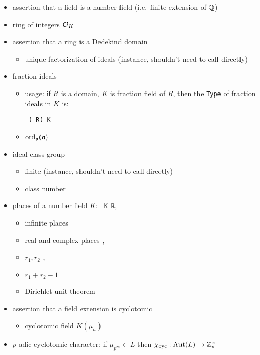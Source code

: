 \begin{itemize}
\item
assertion that a field is a number field (i.e.~finite extension of ${\mathbb {Q}}$)
\item
ring of integers ${\mathcal {O}}_K$ 
\item
assertion that a ring is a Dedekind domain 
\begin{itemize}
\item
unique factorization of ideals 
(instance, shouldn't need to call directly)
\end{itemize}
\item
fraction ideals 
\begin{itemize}
\item
usage: if $R$ is a domain, $K$ is fraction field of $R$,
then the \verb|Type| of fraction ideals in $K$ is:

\verb| (|\verb| R) K|
\item
$\operatorname{ord}_{\mathfrak{p}}({\mathfrak{a}})$ 
\end{itemize}
\item
ideal class group 
\begin{itemize}
\item
finite 
(instance, shouldn't need to call directly)
\item
class number 
\end{itemize}
\item
places of a number field $K$:
\verb| K ℝ|, 
\begin{itemize}
\item
infinite places 
\item
real and complex places
,
\item
$r_1,r_2$
,
\item
$r_1+r_2-1$
\item
Dirichlet unit theorem
\end{itemize}
\item
assertion that a field extension is cyclotomic
\begin{itemize}
\item
cyclotomic field $K(\mu_n)$
\end{itemize}
\item
$p$-adic cyclotomic character:
if $\mu_{p^\infty}\subset L$
then $\chi_{\mathrm{cyc}}:{\mathrm{Aut}}(L)\to{\mathbb {Z}}_p^\times$
\end{itemize}
